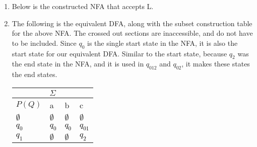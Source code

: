 \documentclass[11pt,fleqn]{article}
\begin{document}
    \medskip
    \begin{enumerate}
     \item Below is the constructed NFA that accepts L.
    \begin{center}
    \end{center}
    
    \medskip
    \item The following is the equivalent DFA, along with the subset construction table for the above NFA. The crossed out sections are inaccessible, and do not have to be included. Since $q_0$ is the single start state in the NFA, it is also the start state for our equivalent DFA. Similar to the start state, because $q_2$ was the end state in the NFA, and it is used in $q_{012}$ and $q_{02}$, it makes these states the end states.
    \begin{center}
        \begin{tabular}{|p{1cm}|p{1cm}|p{1cm}|p{1cm}|}
         \hline
         \multicolumn{4}{|c|}{$\Sigma$} \\
         \hline
         $P(Q)$ & a & b & c\\
         \hline
         \textcolor{black}{\sout{$\emptyset$}} & \textcolor{black}{\sout{$\emptyset$}} & \textcolor{black}{\sout{$\emptyset$}} & \textcolor{black}{\sout{$\emptyset$}}\\
         
         \textcolor{black}{$q_0$} & \textcolor{black}{$q_0$} &
         \textcolor{black}{$q_0$} & \textcolor{black}{$q_{01}$}\\
         
         \textcolor{black}{\sout{$q_1$}} & \textcolor{black}{\sout{$\emptyset$}} &
         \textcolor{black}{\sout{$\emptyset$}} & \textcolor{black}{\sout{$q_2$}}\\
         

\end{tabular}
\end{center}
\end{enumerate}
\end{document}
